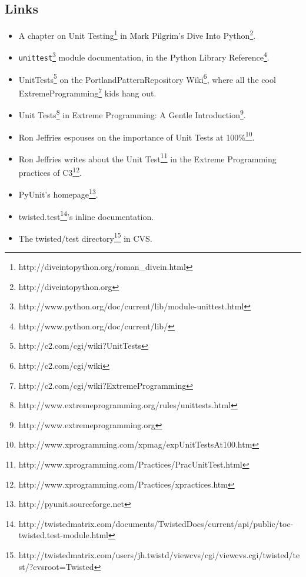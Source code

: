 \subsection{Links}
\label{doc/howto/policy/test-standard.xhtmlHASHlinks}\begin{itemize}
\item A chapter on Unit Testing\footnote{http://diveintopython.org/roman\_divein.html}       in Mark Pilgrim's Dive Into       Python\footnote{http://diveintopython.org}.
\item \texttt{unittest}\footnote{http://www.python.org/doc/current/lib/module-unittest.html} module documentation, in the Python Library       Reference\footnote{http://www.python.org/doc/current/lib/}.
\item UnitTests\footnote{http://c2.com/cgi/wiki?UnitTests} on       the PortlandPatternRepository       Wiki\footnote{http://c2.com/cgi/wiki}, where all the cool ExtremeProgramming\footnote{http://c2.com/cgi/wiki?ExtremeProgramming} kids hang out.
\item Unit       Tests\footnote{http://www.extremeprogramming.org/rules/unittests.html} in Extreme Programming: A Gentle Introduction\footnote{http://www.extremeprogramming.org}.
\item Ron Jeffries espouses on the importance of Unit       Tests at 100\%\footnote{http://www.xprogramming.com/xpmag/expUnitTestsAt100.htm}.
\item Ron Jeffries writes about the Unit       Test\footnote{http://www.xprogramming.com/Practices/PracUnitTest.html} in the Extreme       Programming practices of C3\footnote{http://www.xprogramming.com/Practices/xpractices.htm}.
\item PyUnit's homepage\footnote{http://pyunit.sourceforge.net}.
\item twisted.test\footnote{http://twistedmatrix.com/documents/TwistedDocs/current/api/public/toc-twisted.test-module.html}'s inline documentation.
\item The twisted/test directory\footnote{http://twistedmatrix.com/users/jh.twistd/viewcvs/cgi/viewcvs.cgi/twisted/test/?cvsroot=Twisted} in CVS.
\end{itemize}
